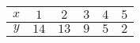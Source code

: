 \begin{tabular}[10pt]{ |c| c| c| c| c| c|}
    \hline
     $x$&$1$&$2$&$3$&$4$&$5$\\ 
    \hline
    $y$&$14$&$13$&$9$&$5$&$2$\\
    \hline 
    \end{tabular}
